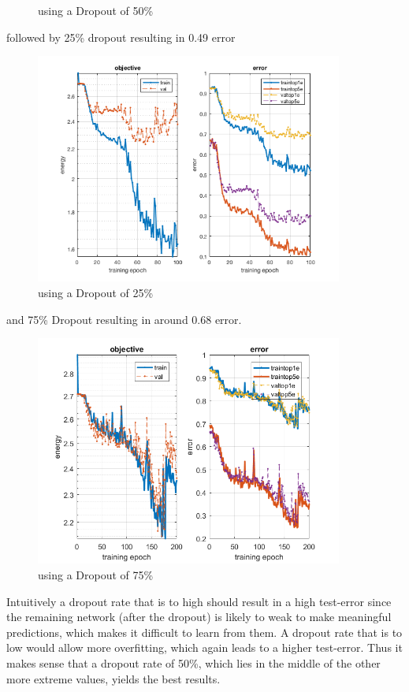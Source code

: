 \documentclass[12pt]{article}
\begin{document}
\begin{enumerate}[a)]
\begin{figure}[H]
                \caption{using a Dropout of 50\%}
        \end{figure}
        followed by 25\% dropout resulting in 0.49 error 
        \begin{figure}[H]
            \centering
                \includegraphics[width=0.9\textwidth]{Plots/3_25_200.png}
                \caption{using a Dropout of 25\%}
        \end{figure}
        and 75\% Dropout resulting in around 0.68 error.
        \begin{figure}[H]
            \centering
                \includegraphics[width=0.9\textwidth]{Plots/3_75_200.png}
                \caption{using a Dropout of 75\%}
        \end{figure}
        Intuitively a dropout rate that is to high should result in a high test-error since the remaining network (after the dropout) is likely to weak to make meaningful predictions, which makes it difficult to learn from them. A dropout rate that is to low would allow more overfitting, which again leads to a higher test-error. Thus it makes sense that a dropout rate of 50\%, which lies in the middle of the other more extreme values, yields the best results.
\end{enumerate}
\end{document}
